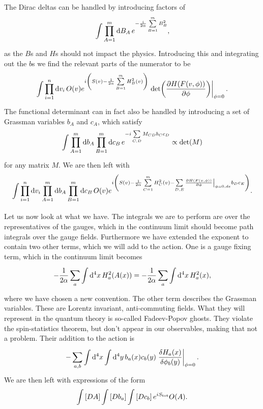 The Dirac deltas can be handled by introducing factors of
\begin{align*}
\int\limits_{}^{}\prod\limits_{A = 1}^{m}\dd{B_{A}}e^{-\frac{i}{2\alpha}\sum\limits_{B = 1}^{m}B_{B}^{2}},
\end{align*}
as the $B$s and $H$s should not impact the physics. Introducing this and integrating out the $b$s we find the relevant parts of the numerator to be
\begin{align*}
\inte{}{}\prod\limits_{i = 1}^{n}\dd{v_{i}}O(v)e^{i\left(S(v) - \frac{1}{2\alpha}\sum\limits_{B = 1}^{m}H_{B}^{2}(v)\right)}\eval{\det(\pdv{H(F(v, \phi))}{\phi})}_{\phi = 0}.
\end{align*}
The functional determinant can in fact also be handled by introducing a set of Grassman variables $b_{A}$ and $c_{A}$, which satisfy
\begin{align*}
\int\limits_{}^{}\prod\limits_{A = 1}^{m}\dd{b_{A}}\prod\limits_{B = 1}^{m}\dd{c_{B}}e^{-i\sum\limits_{C, D} M_{CD}b_{C}c_{D}} \propto \det(M)
\end{align*}
for any matrix $M$. We are then left with
\begin{align*}
\inte{}{}\prod\limits_{i = 1}^{n}\dd{v_{i}}\prod\limits_{A = 1}^{m}\dd{b_{A}}\prod\limits_{B = 1}^{m}\dd{c_{B}}O(v)e^{i\left(S(v) - \frac{1}{2\alpha}\sum\limits_{C = 1}^{m}H_{C}^{2}(v) - \sum\limits_{D, E} \eval{\pdv{H(F(v, \phi))}{\phi}}_{\phi = 0, de}b_{D}c_{E}\right)}.
\end{align*}

Let us now look at what we have. The integrals we are to perform are over the representatives of the gauges, which in the continuum limit should become path integrals over the gauge fields. Furthermore we have extended the exponent to contain two other terms, which we will add to the action. One is a gauge fixing term, which in the continuum limit becomes
\begin{align*}
-\frac{1}{2\alpha}\sum\limits_{a}\int\limits_{}^{}\dd[4]{x}H_{a}^{2}(A(x)) = -\frac{1}{2\alpha}\sum\limits_{a}\int\limits_{}^{}\dd[4]{x}H_{a}^{2}(x),
\end{align*}
where we have chosen a new convention. The other term describes the Grassman variables. These are Lorentz invariant, anti-commuting fields. What they will represent in the quantum theory is so-called Fadeev-Popov ghosts. They violate the spin-statistics theorem, but don't appear in our observables, making that not a problem. Their addition to the action is
\begin{align*}
- \sum\limits_{a, b}\integ[4]{}{}{x}{\integ[4]{}{}{y}{b_{a}(x)c_{b}(y)\eval{\fdv{H_{a}(x)}{\phi_{b}(y)}}_{\phi = 0}}}.
\end{align*}
We are then left with expressions of the form
\begin{align*}
\int\limits_{}\left[DA\right]\int\limits_{}\left[Db_{a}\right]\int\limits_{}\left[Dc_{b}\right]e^{iS_{\text{tot}}}O(A).
\end{align*}

